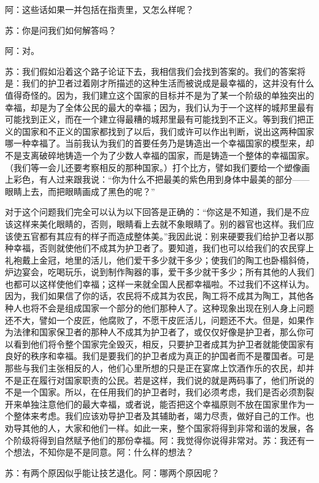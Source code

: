 \documentclass[11pt,oneside]{book}
\begin{document}
\begin{common-format}
阿：这些话如果一并包括在指责里，又怎么样呢？

苏：你是问我们如何解答吗？

阿：对。

苏：我们假如沿着这个路子论证下去，我相信我们会找到答案的。我们的答案将是：我们的护卫者过着刚才所描述的这种生活而被说成是最幸福的，这并没有什么值得奇怪的。因为，我们建立这个国家的目标并不是为了某一个阶级的单独突出的幸福，却是为了全体公民的最大的幸福；因为，我们认为于一个这样的城邦里最有可能找到正义，而在一个建立得最糟的城邦里最有可能找到不正义。等到我们把正义的国家和不正义的国家都找到了以后，我们或许可以作出判断，说出这两种国家哪一种幸福了。当前我认为我们的首要任务乃是铸造出一个幸福国家的模型来，却不是支离破碎地铸造一个为了少数人幸福的国家，而是铸造一个整体的幸福国家。（我们等一会儿还要考察相反的那种国家。）打个比方，譬如我们要给一个塑像画上彩色，有人过来跟我说：“你为什么不把最美的紫色用到身体中最美的部分——眼睛上去，而把眼睛画成了黑色的呢？”

对于这个问题我们完全可以认为以下回答是正确的：“你这是不知道，我们是不应该这样来美化眼睛的，否则，眼睛看上去就不象眼睛了。别的器官也这样。我们应该使五官都有其应有的样子而造成整体美。”我因此说：别来硬要我们给护卫者以那种幸福，否则就使他们不成其为护卫者了。要知道，我们也可以给我们的农民穿上礼袍戴上金冠，地里的活儿，他们爱干多少就干多少；使我们的陶工也卧榻斜倚，炉边宴会，吃喝玩乐，说到制作陶器的事，爱干多少就干多少；所有其他的人我们也都可以这样使他们幸福；这样一来就全国人民都幸福啦。不过我们不这样认为。因为，我们如果信了你的话，农民将不成其为农民，陶工将不成其为陶工，其他各种人也将不会是组成国家一个部分的他们那种人了。这种现象出现在别人身上问题还不大，譬如一个皮匠，他腐败了，不愿干皮匠活儿，问题还不大。但是，如果作为法律和国家保卫者的那种人不成其为护卫者了，或仅仅好像是护卫者，那么你可以看到他们将令整个国家完全毁灭，相反，只要护卫者成其为护卫者就能使国家有良好的秩序和幸福。我们是要我们的护卫者成为真正的护国者而不是覆国者。可是那些与我们主张相反的人，他们心里所想的只是正在宴席上饮酒作乐的农民，却并不是正在履行对国家职责的公民。若是这样，我们说的就是两码事了，他们所说的不是一个国家。所以，在任用我们的护卫者时，我们必须考虑，我们是否必须割裂开来单独注意他们的最大幸福，或者说，能否把这个幸福原则不放在国家里作为一个整体来考虑。我们应该劝导护卫者及其辅助者，竭力尽责，做好自己的工作。也劝导其他的人，大家和他们一样。如此一来，整个国家将得到非常和谐的发展，各个阶级将得到自然赋予他们的那份幸福。阿：我觉得你说得非常对。苏：我还有一个想法，不知你是不是同意。阿：什么样的想法？

苏：有两个原因似乎能让技艺退化。阿：哪两个原因呢？


\end{common-format}
\end{document}
